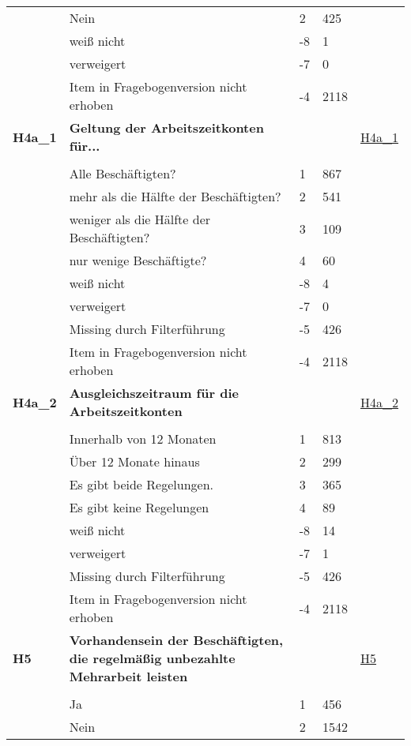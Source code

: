 \begin{longtable}{| L{2.5cm} | L{8.25cm}| C{1.5cm} | R{1.25cm} | C{2.25cm} |  }
   & Nein & 2 & 425 &  \\ 
   & weiß nicht & -8 & 1 &  \\ 
   & verweigert & -7 & 0 &  \\ 
   & Item in Fragebogenversion nicht erhoben & -4 & 2118 &  \\ 
   \midrule
\textbf{H4a\_1}\label{var:suf:H4a:1} & \textbf{Geltung der Arbeitszeitkonten für...} &  &  & \hyperref[H4a:1]{H4a\_1} \\ 
   &  &  &  &  \\ 
   & Alle Beschäftigten? & 1 & 867 &  \\ 
   & mehr als die Hälfte der Beschäftigten? & 2 & 541 &  \\ 
   & weniger als die Hälfte der Beschäftigten? & 3 & 109 &  \\ 
   & nur wenige Beschäftigte? & 4 & 60 &  \\ 
   & weiß nicht & -8 & 4 &  \\ 
   & verweigert & -7 & 0 &  \\ 
   & Missing durch Filterführung & -5 & 426 &  \\ 
   & Item in Fragebogenversion nicht erhoben & -4 & 2118 &  \\ 
   \midrule
\textbf{H4a\_2}\label{var:suf:H4a:2} & \textbf{Ausgleichszeitraum für die Arbeitszeitkonten} &  &  & \hyperref[H4a:2]{H4a\_2} \\ 
   &  &  &  &  \\ 
   & Innerhalb von 12 Monaten & 1 & 813 &  \\ 
   & Über 12 Monate hinaus & 2 & 299 &  \\ 
   & Es gibt beide Regelungen. & 3 & 365 &  \\ 
   & Es gibt keine Regelungen & 4 & 89 &  \\ 
   & weiß nicht & -8 & 14 &  \\ 
   & verweigert & -7 & 1 &  \\ 
   & Missing durch Filterführung & -5 & 426 &  \\ 
   & Item in Fragebogenversion nicht erhoben & -4 & 2118 &  \\ 
   \midrule
\textbf{H5}\label{var:suf:H5} & \textbf{Vorhandensein der Beschäftigten, die regelmäßig unbezahlte Mehrarbeit leisten} &  &  & \hyperref[H5]{H5} \\ 
   &  &  &  &  \\ 
   & Ja & 1 & 456 &  \\ 
   & Nein & 2 & 1542 &  \\ 

\end{longtable}
